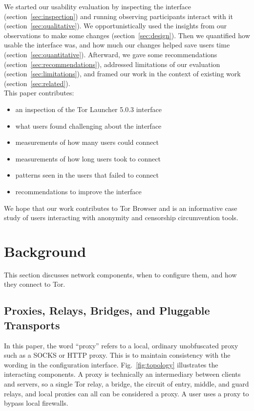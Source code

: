 \documentclass[USenglish,oneside,twocolumn]{article}
\begin{document}
We started our usability evaluation by inspecting the interface (section~\ref{sec:inspection}) and
running observing participants interact with it (section~\ref{sec:qualitative}). 
We opportunistically used the insights from our observations to make some changes (section~\ref{sec:design}).
Then we quantified how usable the interface was, and 
how much our changes helped save users time (section~\ref{sec:quantitative}).
Afterward, we gave some recommendations (section~\ref{sec:recommendations}), addressed
limitations of our evaluation (section~\ref{sec:limitations}), and framed our work in the context of existing work (section~\ref{sec:related}). \\

\noindent This paper contributes:
\smallskip
\begin{itemize}
\item an inspection of the Tor Launcher 5.0.3 interface
\item what users found challenging about the interface
\item measurements of how many users could connect
\item measurements of how long users took to connect
\item patterns seen in the users that failed to connect
\item recommendations to improve the interface
\end{itemize}

We hope that our work contributes to Tor Browser and is an informative case study of users interacting with anonymity and censorship circumvention tools. 

\section{Background}
\label{sec:background}
This section discusses network components, when to configure them, and how they connect to Tor. 

\subsection{Proxies, Relays, Bridges, and Pluggable Transports} 

In this paper, the word ``proxy'' refers to a local, ordinary unobfuscated proxy such as a SOCKS or HTTP proxy. This is to maintain consistency with the wording in the configuration interface. Fig.~\ref{fig:topology} illustrates the interacting components. A proxy is technically an intermediary between clients and servers, so a single Tor relay, a bridge, the circuit of entry, middle, and guard relays, and local proxies can all can be considered a proxy. A user uses a proxy to bypass local firewalls. 
\end{document}
